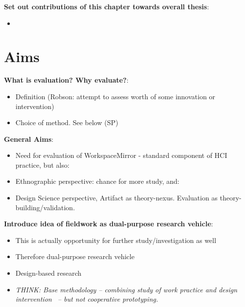 \textbf{Set out contributions of this chapter towards overall thesis}:
\begin{itemize}
	\item 
\end{itemize}



\section{Aims}
\label{main-study:aims}

\textbf{What is evaluation? Why evaluate?}:
\begin{itemize}
	\item Definition (Robson: attempt to assess worth of some innovation or intervention)
	\item Choice of method. See below (SP)
\end{itemize}
	
\textbf{General Aims}:
\begin{itemize}
	\item Need for evaluation of WorkspaceMirror - standard component of HCI practice, but also:
	\item Ethnographic perspective: chance for more study, and:
	\item Design Science perspective, Artifact as theory-nexus. Evaluation as theory-building/validation.
\end{itemize}


\textbf{Introduce idea of fieldwork as dual-purpose research vehicle}:
\begin{itemize}
	\item This is actually opportunity for further study/investigation as well
	\item Therefore dual-purpose research vehicle
	\item Design-based research
	\item \textit{THINK: Base methodology -- combining study of work practice and design intervention~\cite{blomberg:96} -- but not cooperative prototyping.}
\end{itemize}


